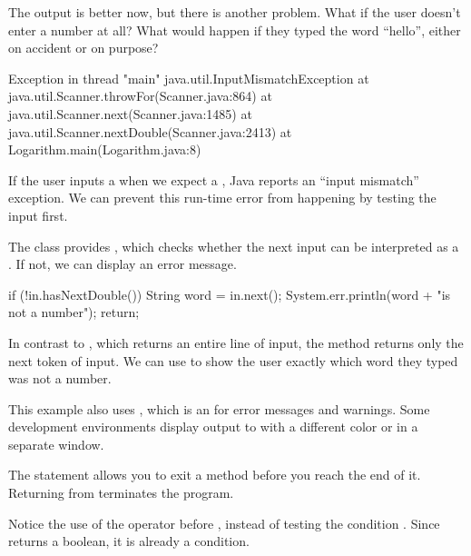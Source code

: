 The output is better now, but there is another problem.
What if the user doesn't enter a number at all?
What would happen if they typed the word ``hello'', either on accident or on purpose?


\begin{small}
	\begin{stdout}
		Exception in thread "main" java.util.InputMismatchException
		at java.util.Scanner.throwFor(Scanner.java:864)
		at java.util.Scanner.next(Scanner.java:1485)
		at java.util.Scanner.nextDouble(Scanner.java:2413)
		at Logarithm.main(Logarithm.java:8)
	\end{stdout}
\end{small}


If the user inputs a  when we expect a , Java reports an ``input mismatch'' exception.
We can prevent this run-time error from happening by testing the input first.

The  class provides , which checks whether the next input can be interpreted as a .
If not, we can display an error message.

\begin{code}
	if (!in.hasNextDouble()) {
		String word = in.next();
		System.err.println(word + "is not a number");
		return;
	}
\end{code}


In contrast to , which returns an entire line of input, the  method returns only the next token of input.
We can use  to show the user exactly which word they typed was not a number.


This example also uses , which is an  for error messages and warnings.
Some development environments display output to  with a different color or in a separate window.


The  statement allows you to exit a method before you reach the end of it.
Returning from  terminates the program.

Notice the use of the \java{!} operator before , instead of testing the condition .
Since  returns a boolean, it is already a condition.


